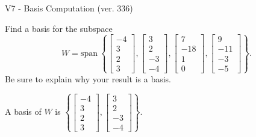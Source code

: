 \begin{exercise}
  \begin{exerciseTitle}V7 - Basis Computation (ver. 336)\end{exerciseTitle}
  \begin{exerciseStatement}
    Find a basis for the subspace 
\[W=\mathrm{span}\ \left\{\left[\begin{array}{r}
-4 \\
3 \\
2 \\
3
\end{array}\right] , \left[\begin{array}{r}
3 \\
2 \\
-3 \\
-4
\end{array}\right] , \left[\begin{array}{r}
7 \\
-18 \\
1 \\
0
\end{array}\right] , \left[\begin{array}{r}
9 \\
-11 \\
-3 \\
-5
\end{array}\right]\right\}.\]
 Be sure to explain why your result is a basis.


  \end{exerciseStatement}
  \begin{exerciseAnswer}
   A basis of \(W\) is  \(\left\{\left[\begin{array}{r}
-4 \\
3 \\
2 \\
3
\end{array}\right] , \left[\begin{array}{r}
3 \\
2 \\
-3 \\
-4
\end{array}\right]\right\}\).
  


  \end{exerciseAnswer}
\end{exercise}